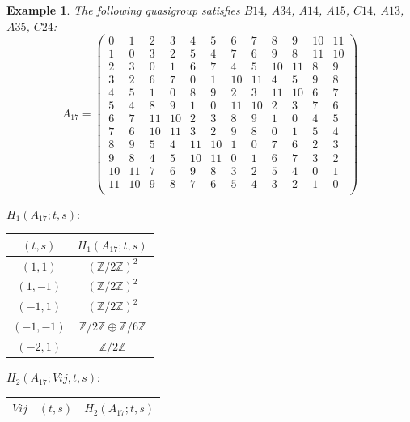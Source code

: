 \documentclass[11pt]{amsart}
\newtheorem{example}[theorem]{Example}
\theoremstyle{definition}
\newcommand{\Z}{\mathbb{Z}}
\begin{document}
\begin{example}
The following quasigroup satisfies 
$B14$, $A34$, $A14$, $A15$, $C14$, $A13$, $A35$, $C24$:
   \[ A_{17} = \left(
\begin{array}{cccccccccccc}
 0 & 1 & 2 & 3 & 4 & 5 & 6 & 7 & 8 & 9 & 10 & 11 \\
 1 & 0 & 3 & 2 & 5 & 4 & 7 & 6 & 9 & 8 & 11 & 10 \\
 2 & 3 & 0 & 1 & 6 & 7 & 4 & 5 & 10 & 11 & 8 & 9 \\
 3 & 2 & 6 & 7 & 0 & 1 & 10 & 11 & 4 & 5 & 9 & 8 \\
 4 & 5 & 1 & 0 & 8 & 9 & 2 & 3 & 11 & 10 & 6 & 7 \\
 5 & 4 & 8 & 9 & 1 & 0 & 11 & 10 & 2 & 3 & 7 & 6 \\
 6 & 7 & 11 & 10 & 2 & 3 & 8 & 9 & 1 & 0 & 4 & 5 \\
 7 & 6 & 10 & 11 & 3 & 2 & 9 & 8 & 0 & 1 & 5 & 4 \\
 8 & 9 & 5 & 4 & 11 & 10 & 1 & 0 & 7 & 6 & 2 & 3 \\
 9 & 8 & 4 & 5 & 10 & 11 & 0 & 1 & 6 & 7 & 3 & 2 \\
 10 & 11 & 7 & 6 & 9 & 8 & 3 & 2 & 5 & 4 & 0 & 1 \\
 11 & 10 & 9 & 8 & 7 & 6 & 5 & 4 & 3 & 2 & 1 & 0 \\
\end{array}
\right)\]


\bigskip


$H_1(A_{17};t,s):$

\begin{center}
    
\begin{tabular}{c|c}
    $(t,s)$ & $H_1(A_{17};t,s)$  \\
    \hline
    $(1,1)$ & $(\Z/2\Z)^2$ \\
    $(1,-1)$ & $(\Z/2\Z)^2$ \\
    $(-1,1)$ & $(\Z/2\Z)^2$ \\
    $(-1,-1)$ & $\Z/2\Z \oplus \Z/6\Z$ \\
    $(-2,1)$ & $\Z/2\Z$ \\
\end{tabular}
\end{center}
\bigskip

$H_2(A_{17};Vij,t,s):$

\begin{center}
    
\begin{tabular}{c|c|c}
    $Vij$ & $(t,s)$ & $H_2(A_{17};t,s)$  \\
    \hline



\end{tabular}
\end{center}
\end{example}
\end{document}
